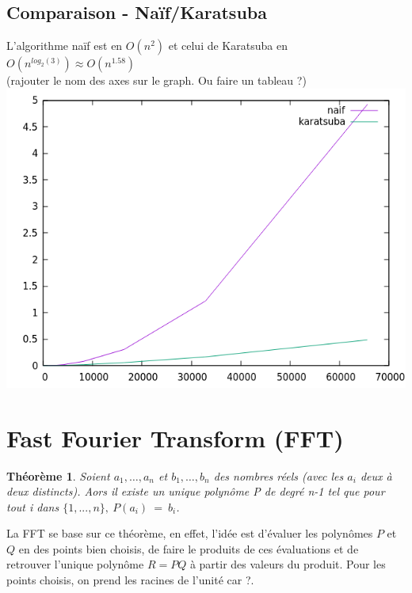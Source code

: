 \documentclass[12pt, a4paper]{article}
\begin{document}
\subsection{Comparaison - Naïf/Karatsuba}
L'algorithme naïf est en $O(n^2)$ et celui de Karatsuba en $O(n^{log_2(3)}) \approx O(n^{1.58})$ \\
(rajouter le nom des axes sur le graph. Ou faire un tableau ?) \\
\includegraphics[scale=1]{naif_kara}\\

\section{Fast Fourier Transform (FFT)}

\newtheorem{Thm1}{Théorème}
\begin{Thm1}
Soient $a_1,\dots,a_n$ et $b_1,\dots,b_n$ des nombres réels (avec les $a_i$ deux à deux distincts). Aors il existe un unique polynôme P de degré n-1 tel que pour tout i dans $\{1,..., n\},\ P(a_i)\ =\ b_i$.
\end{Thm1}

La FFT se base sur ce théorème, en effet, l’idée est d’évaluer les polynômes $P$ et $Q$ en des points bien choisis, de faire le produits de ces évaluations et de retrouver l’unique polynôme $R=PQ$ à partir des valeurs du produit. Pour les points choisis, on prend les racines de l’unité car ?.
 
\end{document}
